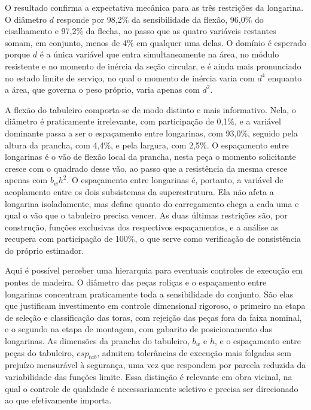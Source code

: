 O resultado confirma a expectativa mecânica para as três restrições da longarina.
O diâmetro $d$ responde por 98{,}2\% da sensibilidade da flexão, 96{,}0\% do cisalhamento e 97{,}2\% da flecha, ao passo que as quatro variáveis restantes somam, em conjunto, menos de 4\% em qualquer uma delas.
O domínio é esperado porque $d$ é a única variável que entra simultaneamente na área, no módulo resistente e no momento de inércia da seção circular, e é ainda mais pronunciado no estado limite de serviço, no qual o momento de inércia varia com $d^4$ enquanto a área, que governa o peso próprio, varia apenas com $d^2$.

A flexão do tabuleiro comporta-se de modo distinto e mais informativo.
Nela, o diâmetro é praticamente irrelevante, com participação de 0{,}1\%, e a variável dominante passa a ser o espaçamento entre longarinas, com 93{,}0\%, seguido pela altura da prancha, com 4{,}4\%, e pela largura, com 2{,}5\%.
O espaçamento entre longarinas é o vão de flexão local da prancha, nesta peça o momento solicitante cresce com o quadrado desse vão, ao passo que a resistência da mesma cresce apenas com $b_w h^2$.
O espaçamento entre longarinas é, portanto, a variável de acoplamento entre os dois subsistemas da superestrutura. Ela não afeta a longarina isoladamente, mas define quanto do carregamento chega a cada uma e qual o vão que o tabuleiro precisa vencer.
As duas últimas restrições são, por construção, funções exclusivas dos respectivos espaçamentos, e a análise as recupera com participação de 100\%, o que serve como verificação de consistência do próprio estimador.

Aqui é possível perceber uma hierarquia para eventuais controles de execução em pontes de madeira.
O diâmetro das peças roliças e o espaçamento entre longarinas concentram praticamente toda a sensibilidade do conjunto.
São elas que justificam investimento em controle dimensional rigoroso, o primeiro na etapa de seleção e classificação das toras, com rejeição das peças fora da faixa nominal, e o segundo na etapa de montagem, com gabarito de posicionamento das longarinas.
As dimensões da prancha do tabuleiro, $b_w$ e $h$, e o espaçamento entre peças do tabuleiro, $esp_{tab}$, admitem tolerâncias de execução mais folgadas sem prejuízo mensurável à segurança, uma vez que respondem por parcela reduzida da variabilidade das funções limite.
Essa distinção é relevante em obra vicinal, na qual o controle de qualidade é necessariamente seletivo e precisa ser direcionado ao que efetivamente importa.

